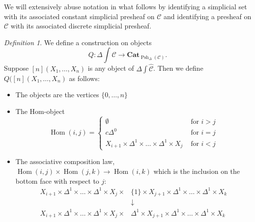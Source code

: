 \documentclass{amsart}
\numberwithin{equation}{section}
\theoremstyle{plain}   %
\theoremstyle{remark}
\newtheorem{defn}[subsection]{Definition}
\theoremstyle{plain}
\newcommand{\Cat}{\ensuremath{\mathbf{Cat}}}
\DeclareMathOperator{\Hom}{Hom}
\newcommand{\psh}[1]{\ensuremath{\widehat{#1}}}
\newcommand{\C}{\ensuremath{\mathcal{C}}}
\newcommand{\spsh}{\ensuremath{\operatorname{Psh}_\Delta(\mathcal{C})}}
\begin{document}
We will extensively abuse notation in what follows by identifying a simplicial set with its associated constant simplicial presheaf on \(\C\) and identifying a presheaf on \(\C\) with its associated discrete simplicial presheaf.

\begin{defn}
	We define a construction on objects \[Q:\Delta\int\psh{\C}\to \Cat_{\spsh}.\] Suppose \([n](X_1,\dots, X_n)\) is any object of \(\Delta\int\psh{\C}\). Then we define \(Q([n](X_1,\dots,X_n)\) as follows:
	\begin{itemize}
		\item The objects are the vertices \(\{0,\dots,n\}\)
		\item The Hom-object
		      \[\Hom(i,j)=
			      \begin{cases}
				      \emptyset                                                & \text{ for } i>j \\
				      c\Delta^0                                                & \text{ for } i=j \\
				      X_{i+1} \times \Delta^1 \times \dots \times \Delta^1 \times X_j & \text{ for } i<j
			      \end{cases}
		      \]
		\item The associative composition law, \(\Hom(i,j)\times \Hom(j,k)\to \Hom(i,k)\) which is the inclusion on the bottom face with respect to \(j\):
		      \begin{align*}
			      X_{i+1}\times \Delta^1\times\dots\times\Delta^1\times X_j \times & \{1\}\times X_{j+1} \times \Delta^1\times\dots\times\Delta^1\times X_k    \\
			                                                                       & \downarrow                                                                \\
			      X_{i+1}\times \Delta^1\times\dots\times\Delta^1\times X_j\times  & \Delta^1\times X_{j+1} \times \Delta^1\times\dots\times\Delta^1\times X_k
		      \end{align*}
	\end{itemize}
\end{defn}
\end{document}

